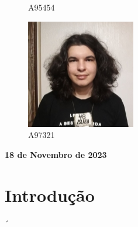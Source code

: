\documentclass[11pt]{article}
\begin{document}
\begin{titlepage}
\begin{center}
\begin{figure}[hbt!]
            \centering
            \caption{A95454}
        \endminipage\hfill        
            \includegraphics[width=\linewidth]{Imagens/slash.png}
            \centering
            \caption{A97321}
        \endminipage
        \end{figure}
        
        \vspace{3cm}
        \textbf{18 de Novembro de 2023}
    \end{center}
    

\end{titlepage}


\thispagestyle{empty}
\cleardoublepage
\tableofcontents 
\clearpage


\section {Introdução}´
\end{document}
